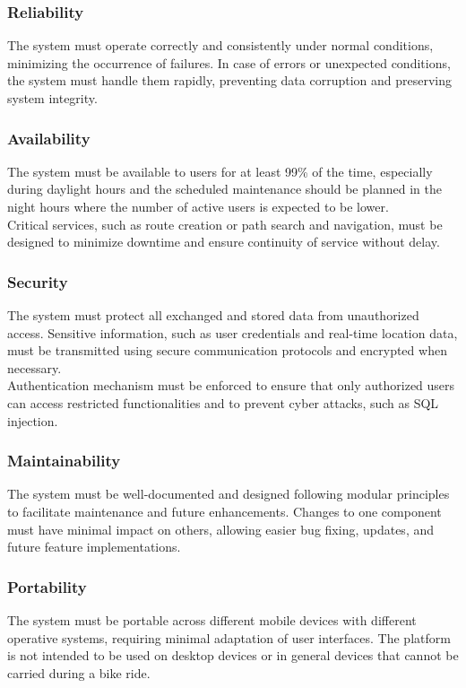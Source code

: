 \subsubsection{Reliability}
The system must operate correctly and consistently under normal conditions, minimizing the occurrence of failures. In case of errors or unexpected conditions, the system must handle them rapidly, preventing data corruption and preserving system integrity.
\subsubsection{Availability}
The system must be available to users for at least 99\% of the time, especially during daylight hours and the scheduled maintenance should be planned in the night hours where the number of active users is expected to be lower. \\[4pt]  
Critical services, such as route creation or path search and navigation, must be designed to minimize downtime and ensure continuity of service without delay.
\subsubsection{Security}
The system must protect all exchanged and stored data from unauthorized access. Sensitive information, such as user credentials and real-time location data, must be transmitted using secure communication protocols and encrypted when necessary. \\[4pt]  
Authentication mechanism must be enforced to ensure that only authorized users can access restricted functionalities and to prevent cyber attacks, such as SQL injection.
\subsubsection{Maintainability}
The system must be well-documented and designed following modular principles to facilitate maintenance and future enhancements.
Changes to one component must have minimal impact on others, allowing easier bug fixing, updates, and future feature implementations.
\subsubsection{Portability}
The system must be portable across different mobile devices with different operative systems, requiring minimal adaptation of user interfaces. The platform is not intended to be used on desktop devices or in general devices that cannot be carried during a bike ride.